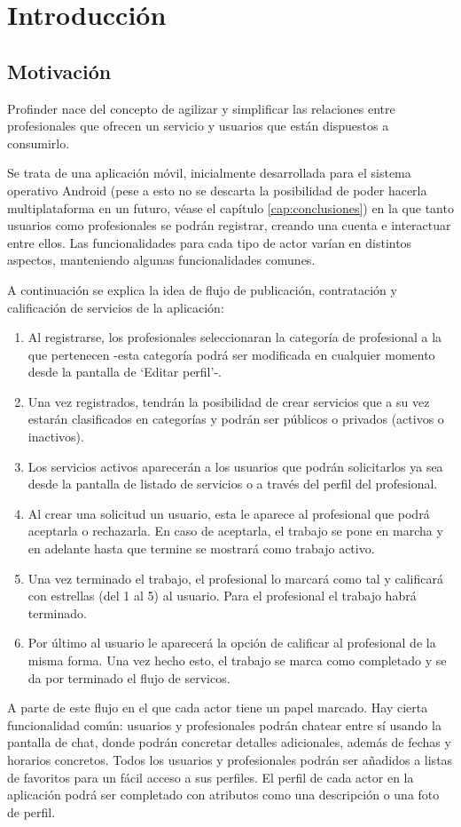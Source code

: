 \chapter{Introducción}
\label{cap:introduccion}


\section{Motivación}
Profinder nace del concepto de agilizar y simplificar las relaciones entre profesionales que ofrecen un servicio y usuarios que están dispuestos a consumirlo.

Se trata de una aplicación móvil, inicialmente desarrollada 
para el sistema operativo Android (pese a esto no se descarta la posibilidad de poder hacerla multiplataforma en un futuro, véase el capítulo \ref{cap:conclusiones}) en la que tanto usuarios como profesionales se podrán registrar, creando una cuenta e interactuar entre ellos. Las funcionalidades para cada tipo de actor varían en distintos aspectos, manteniendo algunas funcionalidades comunes.  

A continuación se explica la idea de flujo de publicación, contratación y calificación de servicios de la aplicación:
\begin{enumerate}
	\item Al registrarse, los profesionales seleccionaran la categoría de profesional a la que pertenecen -esta categoría podrá ser modificada en cualquier momento desde la pantalla de  ‘Editar perfil’-.
	\item Una vez registrados, tendrán la posibilidad de crear servicios que a su vez estarán clasificados en categorías y podrán ser públicos o privados (activos o inactivos).
	\item Los servicios activos aparecerán a los usuarios que podrán solicitarlos ya sea desde la pantalla de listado de servicios o a través del perfil del profesional.
	\item Al crear una solicitud un usuario, esta le aparece al profesional que podrá aceptarla o rechazarla. En caso de aceptarla, el trabajo se pone en marcha y en adelante hasta que termine se mostrará como trabajo activo.
	\item Una vez terminado el trabajo, el profesional lo marcará como tal y calificará con estrellas (del 1 al 5) al usuario. Para el profesional el trabajo habrá terminado.
	\item Por último al usuario le aparecerá la opción de calificar al profesional de la misma forma. Una vez hecho esto, el trabajo se marca como completado y se da por terminado el flujo de servicos.
\end{enumerate}
A parte de este flujo en el que cada actor tiene un papel marcado. Hay cierta funcionalidad común: usuarios y profesionales podrán chatear entre sí usando la pantalla de chat, donde podrán concretar detalles adicionales, además de fechas y horarios concretos. Todos los usuarios y profesionales podrán ser añadidos a listas de favoritos para un fácil acceso a sus perfiles. El perfil de cada actor en la aplicación podrá ser completado con atributos como una descripción o una foto de perfil.

